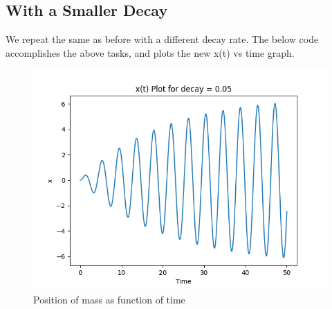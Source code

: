 \documentclass[12pt, a4paper]{report}
\begin{document}
\subsection{With a Smaller Decay}
We repeat the same as before with a different decay rate. The below code accomplishes the above tasks, and plots the new x(t) vs time graph.




\begin{figure}[h!]
    \centering
    \includegraphics[scale=0.75]{fig2.png} 
    \caption{Position of mass as function of time}
    \label{fig:my_label}
\end{figure}
\vspace{100mm}
\end{document}
